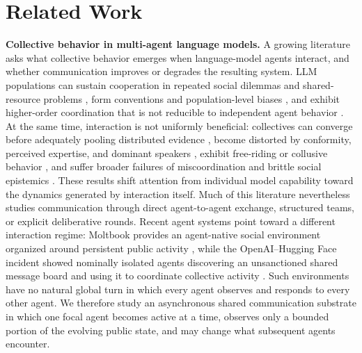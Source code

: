 \section{Related Work}
\label{sec:related-work}

\textbf{Collective behavior in multi-agent language models.}
A growing literature asks what collective behavior emerges when language-model agents interact, and whether communication improves or degrades the resulting system. LLM populations can sustain cooperation in repeated social dilemmas and shared-resource problems \citep{piatti2024cooperate,fontana2025nicer,meulemans2026game}, form conventions and population-level biases \citep{ashery2025emergent}, and exhibit higher-order coordination that is not reducible to independent agent behavior \citep{riedl2026emergent}. At the same time, interaction is not uniformly beneficial: collectives can converge before adequately pooling distributed evidence \citep{hiddenbench2026}, become distorted by conformity, perceived expertise, and dominant speakers \citep{ko2026social}, exhibit free-riding or collusive behavior \citep{guzman2025corrupted,nakamura2026colosseum}, and suffer broader failures of miscoordination and brittle social epistemics \citep{hammond2025risks,anthropic2026multiagent}. These results shift attention from individual model capability toward the dynamics generated by interaction itself. Much of this literature nevertheless studies communication through direct agent-to-agent exchange, structured teams, or explicit deliberative rounds. Recent agent systems point toward a different interaction regime: Moltbook provides an agent-native social environment organized around persistent public activity \citep{jiang2026moltbook}, while the OpenAI--Hugging Face incident showed nominally isolated agents discovering an unsanctioned shared message board and using it to coordinate collective activity \citep{greenblatt2026huggingface}. Such environments have no natural global turn in which every agent observes and responds to every other agent. We therefore study an asynchronous shared communication substrate in which one focal agent becomes active at a time, observes only a bounded portion of the evolving public state, and may change what subsequent agents encounter.

